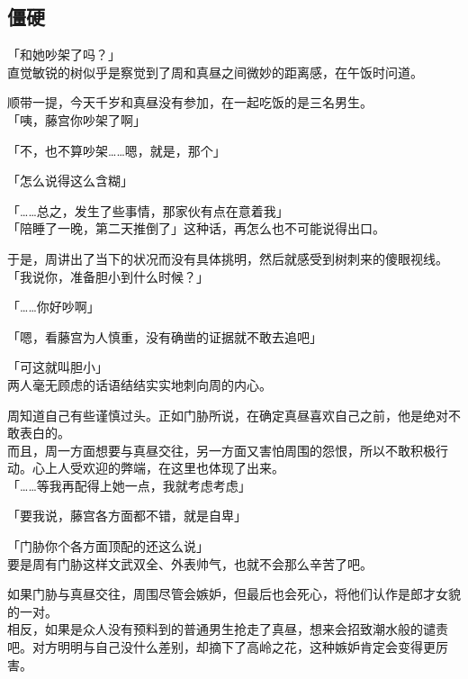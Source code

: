 \subsection{僵硬}

「和她吵架了吗？」\\

直觉敏锐的树似乎是察觉到了周和真昼之间微妙的距离感，在午饭时问道。

顺带一提，今天千岁和真昼没有参加，在一起吃饭的是三名男生。\\

「咦，藤宫你吵架了啊」

「不，也不算吵架……嗯，就是，那个」

「怎么说得这么含糊」

「……总之，发生了些事情，那家伙有点在意着我」\\

「陪睡了一晚，第二天推倒了」这种话，再怎么也不可能说得出口。

于是，周讲出了当下的状况而没有具体挑明，然后就感受到树刺来的傻眼视线。\\

「我说你，准备胆小到什么时候？」

「……你好吵啊」

「嗯，看藤宫为人慎重，没有确凿的证据就不敢去追吧」

「可这就叫胆小」\\

两人毫无顾虑的话语结结实实地刺向周的内心。

周知道自己有些谨慎过头。正如门胁所说，在确定真昼喜欢自己之前，他是绝对不敢表白的。\\

而且，周一方面想要与真昼交往，另一方面又害怕周围的怨恨，所以不敢积极行动。心上人受欢迎的弊端，在这里也体现了出来。\\

「……等我再配得上她一点，我就考虑考虑」

「要我说，藤宫各方面都不错，就是自卑」

「门胁你个各方面顶配的还这么说」\\

要是周有门胁这样文武双全、外表帅气，也就不会那么辛苦了吧。

如果门胁与真昼交往，周围尽管会嫉妒，但最后也会死心，将他们认作是郎才女貌的一对。\\

相反，如果是众人没有预料到的普通男生抢走了真昼，想来会招致潮水般的谴责吧。对方明明与自己没什么差别，却摘下了高岭之花，这种嫉妒肯定会变得更厉害。\\

